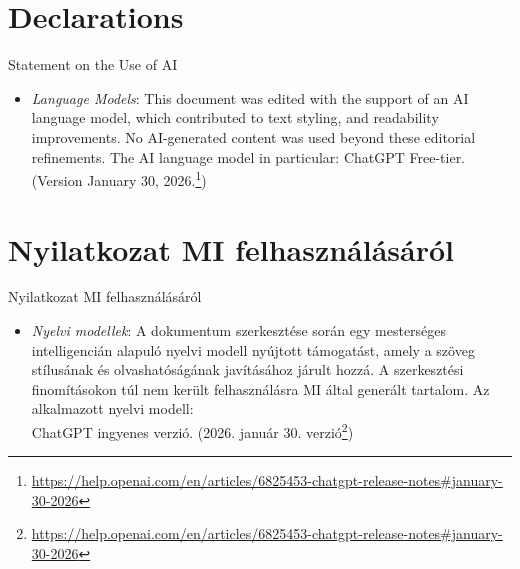 \chapter*{Declarations}


\noindent \large{Statement on the Use of AI}

\begin{itemize}
	\item \textit{Language Models}: This document was edited with the support of an AI language model, which contributed to text styling, and readability improvements.
	No AI-generated content was used beyond these editorial refinements. The AI language model in particular: ChatGPT Free-tier. (Version January 30, 2026.\footnote{\url{https://help.openai.com/en/articles/6825453-chatgpt-release-notes\#january-30-2026}})
\end{itemize}

\chapter*{Nyilatkozat MI felhasználásáról}

\noindent \large{Nyilatkozat MI felhasználásáról}

\begin{itemize}
	\item \textit{Nyelvi modellek}: A dokumentum szerkesztése során egy mes\-ter\-sé\-ges intelligencián alapuló nyelvi modell nyújtott támogatást, a\-mely a szöveg stílusának és olvashatóságának javításához járult hozzá.
	A szerkesztési finomításokon túl nem került felhasználásra MI által generált tartalom.
	Az alkalmazott nyelvi modell: \\ChatGPT in\-gye\-nes verzió. (2026. január 30. verzió\footnote{\url{https://help.openai.com/en/articles/6825453-chatgpt-release-notes\#january-30-2026}})
\end{itemize}
